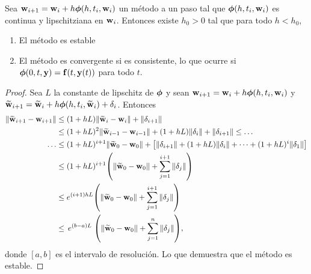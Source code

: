 \begin{theorem}
    Sea $\vb{w}{}_{i+1} = \vb{w}{}_i + h\vb*{\phi}{}(h, t_i, \vb{w}{}_i)$ un método a un paso tal que
    $\vb*{\phi}{}(h, t_i, \vb{w}{}_i)$ es continua y lipschitziana en $\vb{w}{}_i$.
    Entonces existe $h_0 > 0$ tal que para todo $h < h_0$,
    \begin{enumerate}
        \item El método es estable
        \item El método es convergente si es consistente,
        lo que ocurre si $\vb*{\phi}{}(0, t, \vb{y}{}) = \vb{f}{}(t, \vb{y}{}(t))$ para todo $t$.
    \end{enumerate}
\end{theorem}

\begin{proof}
    Sea $L$ la constante de lipschitz de $\vb*{\phi}{}$ y
    sean $\vb{w}{}_{i+1} = \vb{w}{}_i + h\vb*{\phi}{}(h, t_i, \vb{w}{}_i)$ y
    $\vb{\widetilde{w}}{}_{i+1} = \vb{\widetilde{w}}{}_i + h\vb*{\phi}{}(h, t_i, \vb{\widetilde{w}}{}_i) + \delta_i$.
    Entonces
    \begin{align*}
        \norm{\vb{\widetilde{w}}{}_{i+1} - \vb{w}{}_{i+1}} & {} \le
            (1 + hL)\norm{\vb{\widetilde{w}}{}_i - \vb{w}{}_i} + \norm{\delta_{i+1}} \\
        & \le (1 + hL)^2\norm{\vb{\widetilde{w}}{}_{i-1} - \vb{w}{}_{i-1}}
            + (1 + hL)\norm{\delta_i}
            + \norm{\delta_{i+1}} \le \ldots \\
        \ldots & \le (1 + hL)^{i+1}\norm{\vb{\widetilde{w}}{}_0 - \vb{w}{}_0} + \qty[
            \norm{\delta_{i+1}} + (1 + hL)\norm{\delta_i} + \dots
            + (1 + hL)^i\norm{\delta_1}
        ] \\
        & \le (1 + hL)^{i+1}\qty(
            \norm{\vb{\widetilde{w}}{}_0 - \vb{w}{}_0} + \sum_{j=1}^{i+1} \norm{\delta_j}
        ) \\
        & \le e^{(i+1)hL}\qty(
            \norm{\vb{\widetilde{w}}{}_0 - \vb{w}{}_0} + \sum_{j=1}^{i+1} \norm{\delta_j}
        ) \\
        & \le \, e^{(b-a)L} \; \qty(
            \norm{\vb{\widetilde{w}}{}_0 - \vb{w}{}_0} + \sum_{j=1}^n \norm{\delta_j}
        ),
    \end{align*}
    donde $[a, b]$ es el intervalo de resolución.
    Lo que demuestra que el método es estable.


\end{proof}
